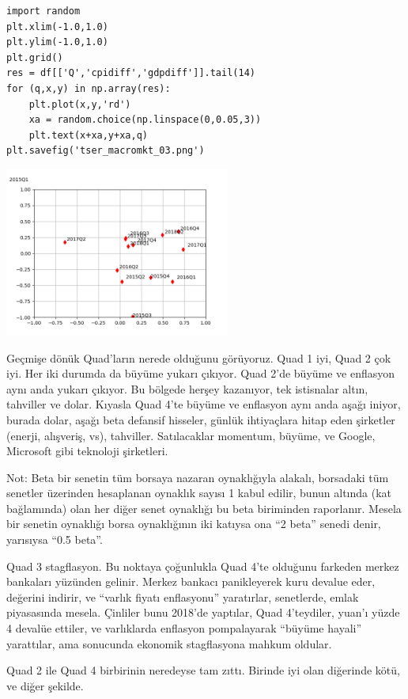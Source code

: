 \documentclass[12pt,fleqn]{article}\usepackage{../../common}
\begin{document}
\begin{verbatim}
import random
plt.xlim(-1.0,1.0)
plt.ylim(-1.0,1.0)
plt.grid()
res = df[['Q','cpidiff','gdpdiff']].tail(14)
for (q,x,y) in np.array(res):
    plt.plot(x,y,'rd')
    xa = random.choice(np.linspace(0,0.05,3))
    plt.text(x+xa,y+xa,q)
plt.savefig('tser_macromkt_03.png')    
\end{verbatim}

\includegraphics[width=20em]{tser_macromkt_03.png}

Geçmişe dönük Quad'ların nerede olduğunu görüyoruz. Quad 1 iyi, Quad 2 çok
iyi. Her iki durumda da büyüme yukarı çıkıyor. Quad 2'de büyüme ve enflasyon
aynı anda yukarı çıkıyor. Bu bölgede herşey kazanıyor, tek istisnalar altın,
tahviller ve dolar. Kıyasla Quad 4'te büyüme ve enflasyon aynı anda aşağı
iniyor, burada dolar, aşağı beta defansif hisseler, günlük ihtiyaçlara hitap
eden şirketler (enerji, alışveriş, vs), tahviller. Satılacaklar momentum,
büyüme, ve Google, Microsoft gibi teknoloji şirketleri.

Not: Beta bir senetin tüm borsaya nazaran oynaklığıyla alakalı, borsadaki tüm
senetler üzerinden hesaplanan oynaklık sayısı 1 kabul edilir, bunun altında (kat
bağlamında) olan her diğer senet oynaklığı bu beta biriminden raporlanır. Mesela
bir senetin oynaklığı borsa oynaklığının iki katıysa ona ``2 beta'' senedi
denir, yarısıysa ``0.5 beta''.

Quad 3 stagflasyon. Bu noktaya çoğunlukla Quad 4'te olduğunu farkeden merkez
bankaları yüzünden gelinir. Merkez bankacı panikleyerek kuru devalue eder,
değerini indirir, ve ``varlık fiyatı enflasyonu'' yaratırlar, senetlerde, emlak
piyasasında mesela. Çinliler bunu 2018'de yaptılar, Quad 4'teydiler, yuan'ı
yüzde 4 devalüe ettiler, ve varlıklarda enflasyon pompalayarak ``büyüme hayali''
yarattılar, ama sonucunda ekonomik stagflasyona mahkum oldular.

Quad 2 ile Quad 4 birbirinin neredeyse tam zıttı. Birinde iyi olan diğerinde
kötü, ve diğer şekilde.
\end{document}
